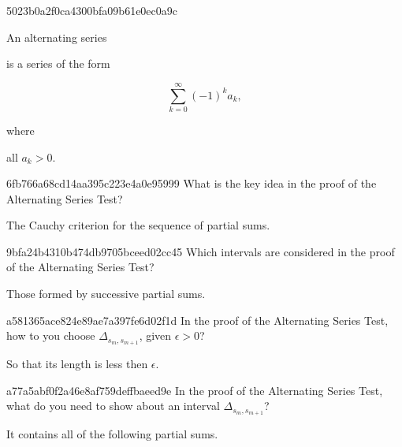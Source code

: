 \begin{note}{5023b0a2f0ca4300bfa09b61e0ec0a9c}
    \begin{icloze}{1}An alternating series\end{icloze} is a series of the form
    \begin{icloze}{2}
        \[
            \sum_{k=0}^{\infty} (-1)^{k}a_k,
        \]
    \end{icloze}
    where \begin{icloze}{3}all \({ a_k > 0 }\).\end{icloze}
\end{note}

\begin{note}{6fb766a68cd14aa395c223e4a0e95999}
    What is the key idea in the proof of the Alternating Series Test?

    \begin{cloze}{1}
        The Cauchy criterion for the sequence of partial sums.
    \end{cloze}
\end{note}

\begin{note}{9bfa24b4310b474db9705bceed02cc45}
    Which intervals are considered in the proof of the Alternating Series Test?

    \begin{cloze}{1}
        Those formed by successive partial sums.
    \end{cloze}
\end{note}

\begin{note}{a581365ace824e89ae7a397fe6d02f1d}
    In the proof of the Alternating Series Test, how to you choose \({ \Delta_{s_m, s_{m+1}} }\), given \({ \epsilon > 0 }\)?

    \begin{cloze}{1}
        So that its length is less then \({ \epsilon }\).
    \end{cloze}
\end{note}

\begin{note}{a77a5abf0f2a46e8af759deffbaeed9e}
    In the proof of the Alternating Series Test, what do you need to show about an interval \({ \Delta_{s_m, s_{m+1}} }\)?

    \begin{cloze}{1}
        It contains all of the following partial sums.
    \end{cloze}
\end{note}

